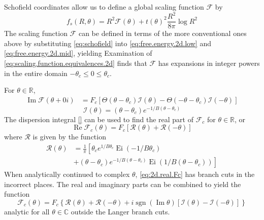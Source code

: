 \documentclass[
  aps,
  pre,
  preprint,
  longbibliography,
  floatfix
]{revtex4-2}
\begin{document}
Schofield coordinates allow us to define a global scaling function $\mathcal F$ by
\begin{equation} \label{eq:schofield.2d.free.energy}
  f_s(R, \theta) = R^2\mathcal F(\theta) + t(\theta)^2\frac{R^2}{8\pi}\log R^2
\end{equation}
The scaling function $\mathcal F$ can be defined in terms of the more
conventional ones above by substituting \eqref{eq:schofield} into \eqref{eq:free.energy.2d.low} and
\eqref{eq:free.energy.2d.mid}, yielding
Examination of \eqref{eq:scaling.function.equivalences.2d} finds that $\mathcal F$ has expansions in integer powers in the entire domain $-\theta_c\leq0\leq\theta_c$.

For $\theta\in\mathbb R$,
\begin{equation}
  \begin{aligned}
    \operatorname{Im}\mathcal F(\theta+0i)&=F_c[\Theta(\theta-\theta_c)\mathcal I(\theta)-\Theta(-\theta-\theta_c)\mathcal I(-\theta)]
  \end{aligned}
\end{equation}
\begin{equation}
  \mathcal I(\theta)=(\theta-\theta_c)e^{-1/B(\theta-\theta_c)}
\end{equation}
The dispersion integral \eqref{} can be used to find the real part of $\mathcal F_c$ for $\theta\in\mathbb R$, or
\begin{equation} \label{eq:2d.real.Fc}
  \operatorname{Re}\mathcal F_c(\theta)=F_c[\mathcal R(\theta)+\mathcal R(-\theta)]
\end{equation}
where $\mathcal R$ is given by the function
\begin{equation}
  \begin{aligned}
  \mathcal R(\theta)
  &=\frac1\pi\left[
    \theta_ce^{1/B\theta_c}\operatorname{Ei}(-1/B\theta_c)
    \right.\\
  &\left.
    +(\theta-\theta_c)e^{-1/B(\theta-\theta_c)}\operatorname{Ei}(1/B(\theta-\theta_c))
  \right]
  \end{aligned}
\end{equation}
When analytically continued to complex $\theta$, \eqref{eq:2d.real.Fc} has branch cuts in the incorrect places. The real and imaginary parts can be combined to yield the function
\begin{equation}
  \mathcal F_c(\theta)=F_c\left\{
    \mathcal R(\theta)+\mathcal R(-\theta)+i\operatorname{sgn}(\operatorname{Im}\theta)[\mathcal I(\theta)-\mathcal I(-\theta)]
  \right\}
\end{equation}
analytic for all $\theta\in\mathbb C$ outside the Langer branch cuts.
\end{document}
